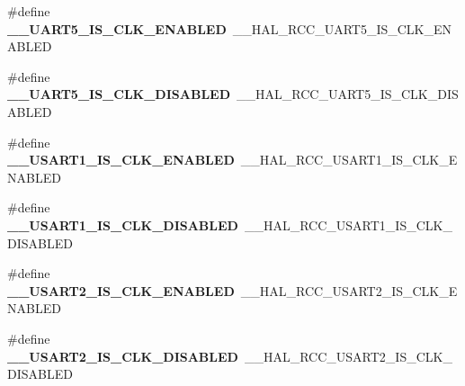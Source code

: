 \begin{DoxyCompactItemize}
\item 
\#define {\bfseries \+\_\+\+\_\+\+U\+A\+R\+T5\+\_\+\+I\+S\+\_\+\+C\+L\+K\+\_\+\+E\+N\+A\+B\+L\+ED}~\+\_\+\+\_\+\+H\+A\+L\+\_\+\+R\+C\+C\+\_\+\+U\+A\+R\+T5\+\_\+\+I\+S\+\_\+\+C\+L\+K\+\_\+\+E\+N\+A\+B\+L\+ED\hypertarget{group___h_a_l___r_c_c___aliased_gac8a52d100f428d3a279d63c67b944d14}{}\label{group___h_a_l___r_c_c___aliased_gac8a52d100f428d3a279d63c67b944d14}

\item 
\#define {\bfseries \+\_\+\+\_\+\+U\+A\+R\+T5\+\_\+\+I\+S\+\_\+\+C\+L\+K\+\_\+\+D\+I\+S\+A\+B\+L\+ED}~\+\_\+\+\_\+\+H\+A\+L\+\_\+\+R\+C\+C\+\_\+\+U\+A\+R\+T5\+\_\+\+I\+S\+\_\+\+C\+L\+K\+\_\+\+D\+I\+S\+A\+B\+L\+ED\hypertarget{group___h_a_l___r_c_c___aliased_ga9c9ebd9d85dd7aae9fc3ed7bf013ce57}{}\label{group___h_a_l___r_c_c___aliased_ga9c9ebd9d85dd7aae9fc3ed7bf013ce57}

\item 
\#define {\bfseries \+\_\+\+\_\+\+U\+S\+A\+R\+T1\+\_\+\+I\+S\+\_\+\+C\+L\+K\+\_\+\+E\+N\+A\+B\+L\+ED}~\+\_\+\+\_\+\+H\+A\+L\+\_\+\+R\+C\+C\+\_\+\+U\+S\+A\+R\+T1\+\_\+\+I\+S\+\_\+\+C\+L\+K\+\_\+\+E\+N\+A\+B\+L\+ED\hypertarget{group___h_a_l___r_c_c___aliased_ga68f879347beda3f37030ad4ffaf87f8a}{}\label{group___h_a_l___r_c_c___aliased_ga68f879347beda3f37030ad4ffaf87f8a}

\item 
\#define {\bfseries \+\_\+\+\_\+\+U\+S\+A\+R\+T1\+\_\+\+I\+S\+\_\+\+C\+L\+K\+\_\+\+D\+I\+S\+A\+B\+L\+ED}~\+\_\+\+\_\+\+H\+A\+L\+\_\+\+R\+C\+C\+\_\+\+U\+S\+A\+R\+T1\+\_\+\+I\+S\+\_\+\+C\+L\+K\+\_\+\+D\+I\+S\+A\+B\+L\+ED\hypertarget{group___h_a_l___r_c_c___aliased_ga5fe42363e1af6ecad731290b6e295865}{}\label{group___h_a_l___r_c_c___aliased_ga5fe42363e1af6ecad731290b6e295865}

\item 
\#define {\bfseries \+\_\+\+\_\+\+U\+S\+A\+R\+T2\+\_\+\+I\+S\+\_\+\+C\+L\+K\+\_\+\+E\+N\+A\+B\+L\+ED}~\+\_\+\+\_\+\+H\+A\+L\+\_\+\+R\+C\+C\+\_\+\+U\+S\+A\+R\+T2\+\_\+\+I\+S\+\_\+\+C\+L\+K\+\_\+\+E\+N\+A\+B\+L\+ED\hypertarget{group___h_a_l___r_c_c___aliased_gab3ab022f37b6c36986ce59b53a092bda}{}\label{group___h_a_l___r_c_c___aliased_gab3ab022f37b6c36986ce59b53a092bda}

\item 
\#define {\bfseries \+\_\+\+\_\+\+U\+S\+A\+R\+T2\+\_\+\+I\+S\+\_\+\+C\+L\+K\+\_\+\+D\+I\+S\+A\+B\+L\+ED}~\+\_\+\+\_\+\+H\+A\+L\+\_\+\+R\+C\+C\+\_\+\+U\+S\+A\+R\+T2\+\_\+\+I\+S\+\_\+\+C\+L\+K\+\_\+\+D\+I\+S\+A\+B\+L\+ED\hypertarget{group___h_a_l___r_c_c___aliased_gab5889d1f5773072ac716fecf8e03f555}{}\label{group___h_a_l___r_c_c___aliased_gab5889d1f5773072ac716fecf8e03f555}


\end{DoxyCompactItemize}
